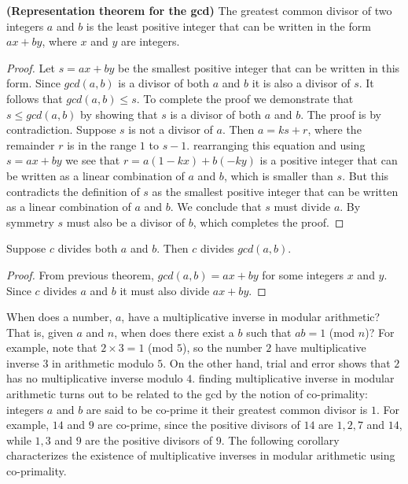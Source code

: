 \begin{theorem}
    \textbf{(Representation theorem for the gcd)} The greatest common divisor of two integers $a$ and $b$ is the least positive integer that can be written in the form $ax+by$, where $x$ and $y$ are integers.
\end{theorem}
\begin{proof}
    Let $s = ax+by$ be the smallest positive integer that can be written in this form. Since $gcd(a,b)$ is a divisor of both $a$ and $b$ it is also a divisor of $s$. It follows that $gcd(a,b) \leq s$. To complete the proof we demonstrate that $s \leq gcd(a,b)$ by showing that $s$ is a divisor of both $a$ and $b$. The proof is by contradiction. Suppose $s$ is not a divisor of $a$. Then $a =ks+r$, where the remainder $r$ is in the range $1$ to $s-1$. rearranging this equation and using $s=ax+by$ we see that $r=a(1-kx)+b(-ky)$ is a positive integer that can be written as a linear combination of $a$ and $b$, which is smaller than $s$. But this contradicts the definition of $s$ as the smallest positive integer that can be written as a linear combination of $a$ and $b$. We conclude that $s$ must divide $a$. By symmetry $s$ must also be a divisor of $b$, which completes the proof.
\end{proof}

\begin{corollary}
    Suppose $c$ divides both $a$ and $b$. Then $c$ divides $gcd(a,b)$.
\end{corollary}
\begin{proof}
    From previous theorem, $gcd(a,b)=ax+by$ for some integers $x$ and $y$. Since $c$ divides $a$ and $b$ it must also divide $ax+by$.
\end{proof}

When does a number, $a$, have a multiplicative inverse in modular arithmetic? That is, given $a$ and $n$, when does there exist a $b$ such that $ab=1$ (mod $n$)? For example, note that $2 \times 3 = 1$ (mod $5$), so the number $2$ have multiplicative inverse $3$ in arithmetic modulo $5$. On the other hand, trial and error shows that $2$ has no multiplicative inverse modulo $4$. finding multiplicative inverse in modular arithmetic turns out to be related to the gcd by the notion of co-primality: integers $a$ and $b$ are said to be co-prime it their greatest common divisor is $1$. For example, $14$ and $9$ are co-prime, since the positive divisors of $14$ are $1,2,7$ and $14$, while $1,3$ and $9$ are the positive divisors of $9$. The following corollary characterizes the existence of multiplicative inverses in modular arithmetic using co-primality.

